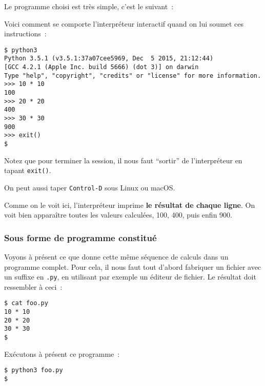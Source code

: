    Le programme choisi est très simple, c'est le suivant~:

    \begin{Shaded}
\begin{Highlighting}[]
 \OperatorTok{*} 
 \OperatorTok{*} 
 \OperatorTok{*} 
\end{Highlighting}
\end{Shaded}

    Voici comment se comporte l'interpréteur interactif quand on lui soumet
ces instructions~:

    \begin{verbatim}
$ python3
Python 3.5.1 (v3.5.1:37a07cee5969, Dec  5 2015, 21:12:44)
[GCC 4.2.1 (Apple Inc. build 5666) (dot 3)] on darwin
Type "help", "copyright", "credits" or "license" for more information.
>>> 10 * 10
100
>>> 20 * 20
400
>>> 30 * 30
900
>>> exit()
$
\end{verbatim}

    Notez que pour terminer la session, il nous faut ``sortir'' de
l'interpréteur en tapant \texttt{exit()}.

On peut aussi taper \texttt{Control-D} sous Linux ou macOS.

    Comme on le voit ici, l'interpréteur imprime \textbf{le résultat de
chaque ligne}. On voit bien apparaître toutes les valeurs calculées,
100, 400, puis enfin 900.

    \hypertarget{sous-forme-de-programme-constituuxe9}{%
\subsubsection{Sous forme de programme
constitué}\label{sous-forme-de-programme-constituuxe9}}

    Voyons à présent ce que donne cette même séquence de calculs dans un
programme complet. Pour cela, il nous faut tout d'abord fabriquer un
fichier avec un suffixe en \texttt{.py}, en utilisant par exemple un
éditeur de fichier. Le résultat doit ressembler à ceci~:

    \begin{verbatim}
$ cat foo.py
10 * 10
20 * 20
30 * 30
$
\end{verbatim}

    Exécutons à présent ce programme~:

    \begin{verbatim}
$ python3 foo.py
$
\end{verbatim}

